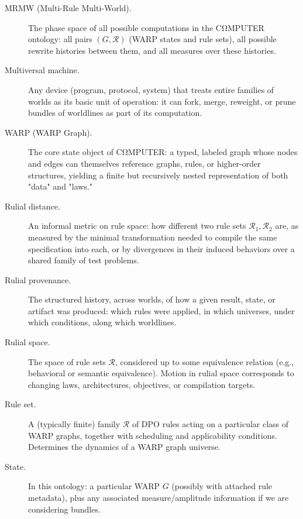 \begin{description}
  \item[MRMW (Multi-Rule Multi-World).]
    The phase space of all possible computations in the CΩMPUTER ontology:
    all pairs $(G,\mathcal{R})$ (WARP states and rule sets), all possible
    rewrite histories between them, and all measures over these histories.

  \item[Multiversal machine.]
    Any device (program, protocol, system) that treats entire families of
    worlds as its basic unit of operation: it can fork, merge, reweight,
    or prune bundles of worldlines as part of its computation.

  \item[WARP (WARP Graph).]
    The core state object of CΩMPUTER: a typed, labeled graph whose nodes
    and edges can themselves reference graphs, rules, or higher-order
    structures, yielding a finite but recursively nested representation
    of both "data" and "laws."

  \item[Rulial distance.]
    An informal metric on rule space: how different two rule sets
    $\mathcal{R}_1,\mathcal{R}_2$ are, as measured by the minimal
    transformation needed to compile the same specification into each,
    or by divergences in their induced behaviors over a shared family
    of test problems.

  \item[Rulial provenance.]
    The structured history, across worlds, of how a given result, state,
    or artifact was produced: which rules were applied, in which universes,
    under which conditions, along which worldlines.

  \item[Rulial space.]
    The space of rule sets $\mathcal{R}$, considered up to some equivalence
    relation (e.g., behavioral or semantic equivalence). Motion in rulial
    space corresponds to changing laws, architectures, objectives, or
    compilation targets.

  \item[Rule set.]
    A (typically finite) family $\mathcal{R}$ of DPO rules acting on a
    particular class of WARP graphs, together with scheduling and applicability
    conditions. Determines the dynamics of a WARP graph universe.

  \item[State.]
    In this ontology: a particular WARP $G$ (possibly with attached rule
    metadata), plus any associated measure/amplitude information if we are
    considering bundles.


\end{description}
